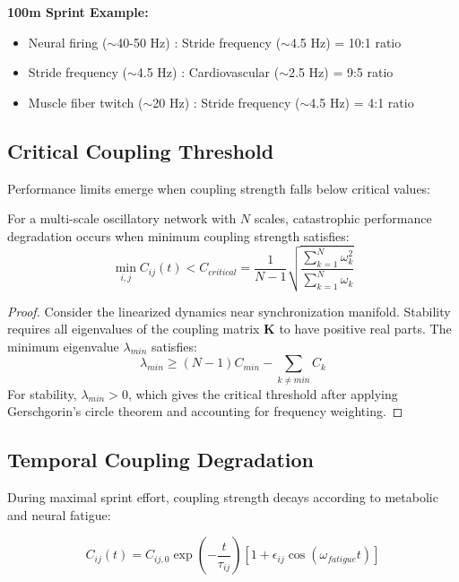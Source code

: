 \textbf{100m Sprint Example:}
\begin{itemize}
\item Neural firing ($\sim$40-50 Hz) : Stride frequency ($\sim$4.5 Hz) = 10:1 ratio
\item Stride frequency ($\sim$4.5 Hz) : Cardiovascular ($\sim$2.5 Hz) = 9:5 ratio
\item Muscle fiber twitch ($\sim$20 Hz) : Stride frequency ($\sim$4.5 Hz) = 4:1 ratio
\end{itemize}

\subsection{Critical Coupling Threshold}

Performance limits emerge when coupling strength falls below critical values:

\begin{theorem}
For a multi-scale oscillatory network with $N$ scales, catastrophic performance degradation occurs when minimum coupling strength satisfies:
\begin{equation}
\min_{i,j} C_{ij}(t) < C_{critical} = \frac{1}{N-1}\sqrt{\frac{\sum_{k=1}^{N} \omega_k^2}{\sum_{k=1}^{N} \omega_k}}
\label{eq:critical_coupling}
\end{equation}
\end{theorem}

\begin{proof}
Consider the linearized dynamics near synchronization manifold. Stability requires all eigenvalues of the coupling matrix $\mathbf{K}$ to have positive real parts. The minimum eigenvalue $\lambda_{min}$ satisfies:
\begin{equation}
\lambda_{min} \geq (N-1) C_{min} - \sum_{k \neq min} C_k
\end{equation}
For stability, $\lambda_{min} > 0$, which gives the critical threshold after applying Gerschgorin's circle theorem and accounting for frequency weighting.
\end{proof}

\subsection{Temporal Coupling Degradation}

During maximal sprint effort, coupling strength decays according to metabolic and neural fatigue:

\begin{equation}
C_{ij}(t) = C_{ij,0} \exp\left(-\frac{t}{\tau_{ij}}\right) \left[1 + \epsilon_{ij} \cos(\omega_{fatigue} t)\right]
\label{eq:coupling_decay}
\end{equation}

